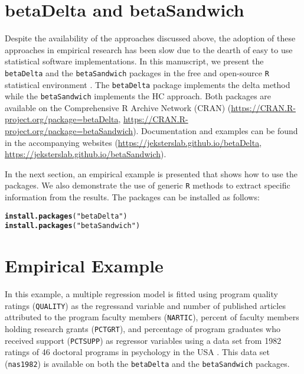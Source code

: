 \documentclass[man]{apa7}\usepackage[]{graphicx}\usepackage[]{xcolor}
\makeatletter
\newcommand{\hlstr}[1]{\textcolor[rgb]{0.192,0.494,0.8}{#1}}%
\newcommand{\hlstd}[1]{\textcolor[rgb]{0.345,0.345,0.345}{#1}}%
\newcommand{\hlkwd}[1]{\textcolor[rgb]{0.737,0.353,0.396}{\textbf{#1}}}%
\newenvironment{kframe}{%
 \def\at@end@of@kframe{}%
 \ifinner\ifhmode%
  \def\at@end@of@kframe{\end{minipage}}%
  \begin{minipage}{\columnwidth}%
 \fi\fi%
 \def\FrameCommand##1{\hskip\@totalleftmargin \hskip-\fboxsep
 \colorbox{shadecolor}{##1}\hskip-\fboxsep
     \hskip-\linewidth \hskip-\@totalleftmargin \hskip\columnwidth}%
 \MakeFramed {\advance\hsize-\width
   \@totalleftmargin\z@ \linewidth\hsize
   \@setminipage}}%
 {\par\unskip\endMakeFramed%
 \at@end@of@kframe}
\newenvironment{knitrout}{}{} %
\makeatother
\begin{document}
\section{betaDelta and betaSandwich}

Despite the availability of the approaches discussed above,
the adoption of these approaches in empirical research has been slow
due to the dearth of
easy to use statistical software implementations.
In this manuscript,
we present the \texttt{betaDelta} and the \texttt{betaSandwich} packages
in the free and open-source \texttt{R} statistical environment
\parencite{Lib-R-Manual-2022}.
The \texttt{betaDelta} package implements the delta method
while the \texttt{betaSandwich} implements the HC approach.
Both packages are available on the Comprehensive R Archive Network (CRAN)
(\url{https://CRAN.R-project.org/package=betaDelta},
\url{https://CRAN.R-project.org/package=betaSandwich}).
Documentation and examples can be found
in the accompanying websites
(\url{https://jeksterslab.github.io/betaDelta},
\url{https://jeksterslab.github.io/betaSandwich}).

In the next section,
an empirical example is presented that shows how to use the packages.
We also demonstrate the use of generic \texttt{R}
methods to extract specific information from the results.
The packages can be installed as follows:

\vspace{-.5em}
\begin{minipage}{.75\linewidth}
	\singlespacing
\begin{knitrout}\scriptsize
{}\color{fgcolor}\begin{kframe}
\begin{alltt}
\hlkwd{install.packages}\hlstd{(}\hlstr{"betaDelta"}\hlstd{)}
\hlkwd{install.packages}\hlstd{(}\hlstr{"betaSandwich"}\hlstd{)}
\end{alltt}
\end{kframe}
\end{knitrout}
\end{minipage}

\section{Empirical Example}

In this example,
a multiple regression model is fitted
using program quality ratings
(\texttt{QUALITY})
as the regressand variable
and number of published articles attributed to the program faculty members
(\texttt{NARTIC}),
percent of faculty members holding research grants
(\texttt{PCTGRT}),
and percentage of program graduates who received support
(\texttt{PCTSUPP})
as regressor variables
using a data set from 1982 ratings of 46 doctoral programs in psychology
in the USA
\parencite{nas1982}.
This data set
(\texttt{nas1982})
is available on both the
\texttt{betaDelta}
and the
\texttt{betaSandwich} packages.
\end{document}
